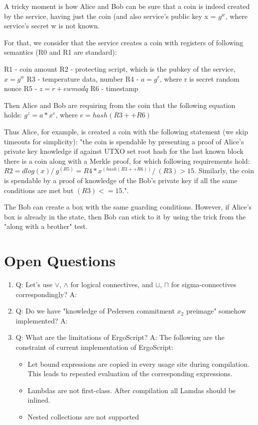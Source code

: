 \documentclass[11pt]{article}
\newcommand{\langname}{ErgoScript\xspace}
\begin{document}
A tricky moment is how Alice and Bob can be sure that a coin is indeed created by the service, having just the coin (and also service's public key x = $g^w$, where service's secret w is not known.
    
For that, we consider that the service creates a coin with registers of following semantics (R0 and R1 are standard):
    
R1 - coin amount
R2 - protecting script, which is the pubkey of the service, $x = g^w$
R3 - temperature data, number
R4 - $a = g^r$, where r is secret random nonce
R5 - $z = r + ew mod q$
R6 - timestamp
    
Then Alice and Bob are requiring from the coin that the following equation holds: $g^z = a * x^e$, where $e = hash(R3 ++ R6)$
    
Thus Alice, for example, is created a coin with the following statement (we skip timeouts for simplicity):
"the coin is spendable by presenting a proof of Alice's private key knowledge if against UTXO set root hash for
the last known block there is a coin along with a Merkle proof, for which following requirements hold:
$R2 = dlog(x) /\ g^(R5) = R4 * x^(hash(R3 ++ R6)) /\ (R3) > 15$. Similarly, the coin is spendable by a proof of
knowledge of the Bob's private key if all the same conditions are met but $(R3) <= 15$.".
    
The Bob can create a box with the same guarding conditions. However, if Alice's box is already in the state, then Bob can stick to it by using the trick from the "along with a brother" test.

\section{Open Questions}

\begin{enumerate}
  \item Q: Let's use $\lor$, $\land$ for logical connectives, and $\sqcup$, $\sqcap$ for
           sigma-connectives correspondingly? \linebreak
        A:
  \item Q: Do we have "knowledge of Pedersen commitment $x_2$ preimage" somehow implemented? \linebreak
        A:
  \item Q: What are the limitations of \langname? \linebreak
        A: The following are the constraint of current implementation of \langname:
        \begin{itemize}
          \item Let bound expressions are copied in every usage site during compilation. This leads to repeated evaluation of the corresponding expressions.
          \item Lambdas are not first-class. After compilation all Lamdas should be inlined.
          \item Nested collections are not supported
        \end{itemize}
\end{enumerate}
\end{document}
